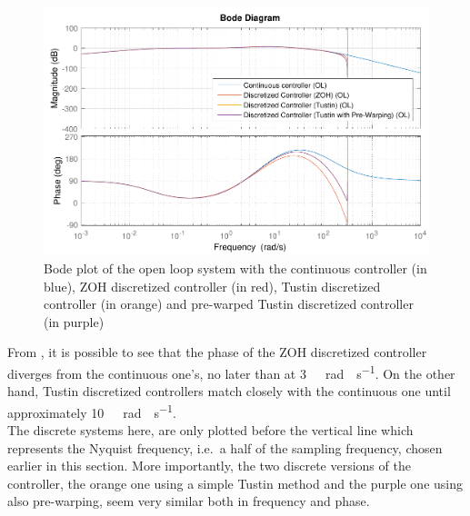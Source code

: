 \begin{figure}[H]
  \centering
  \includegraphics[scale=.6]{figures/zohVsPrewarpVsNoPrewarpVsContinuousBodeOpenLoop}
  \caption{Bode plot of the open loop system with the continuous controller (in blue), ZOH discretized controller (in red), Tustin discretized controller (in orange) and pre-warped Tustin discretized controller (in purple)}
  \label{fig:bodePrewarpVsNoPrewarpVsContinuousOpenLoop}
\end{figure}
%
From , it is possible to see that the phase of the ZOH discretized controller diverges from the continuous one's, no later than at \si{3\ rad \cdot s^{-1}}. On the other hand, Tustin discretized controllers match closely with the continuous one until approximately \si{10\ rad \cdot s^{-1}}. \\
The discrete systems here, are only plotted before the vertical line which represents the Nyquist frequency, i.e.~a half of the sampling frequency, chosen earlier in this section. More importantly, the two discrete versions of the controller, the orange one using a simple Tustin method and the purple one using also pre-warping, seem very similar both in frequency and phase.

